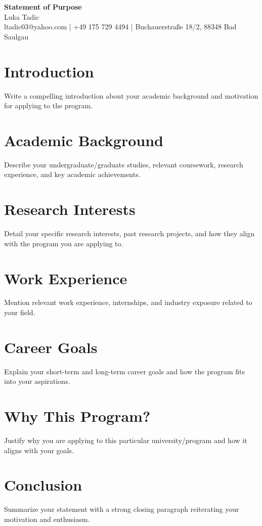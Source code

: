 \documentclass[11pt,a4paper]{article}
\begin{document}
\begin{center}
    {\Large \textbf{Statement of Purpose}}\\[10pt]
    {\large Luka Tadic}\\[5pt]
    {\normalsize ltadic03@yahoo.com | +49 175 729 4494 | Buchauerstraße 18/2, 88348 Bad Saulgau}
\end{center}

\section*{Introduction}
Write a compelling introduction about your academic background and motivation for applying to the program.

\section*{Academic Background}
Describe your undergraduate/graduate studies, relevant coursework, research experience, and key academic achievements.

\section*{Research Interests}
Detail your specific research interests, past research projects, and how they align with the program you are applying to.

\section*{Work Experience}
Mention relevant work experience, internships, and industry exposure related to your field.

\section*{Career Goals}
Explain your short-term and long-term career goals and how the program fits into your aspirations.

\section*{Why This Program?}
Justify why you are applying to this particular university/program and how it aligns with your goals.

\section*{Conclusion}
Summarize your statement with a strong closing paragraph reiterating your motivation and enthusiasm.
\end{document}
